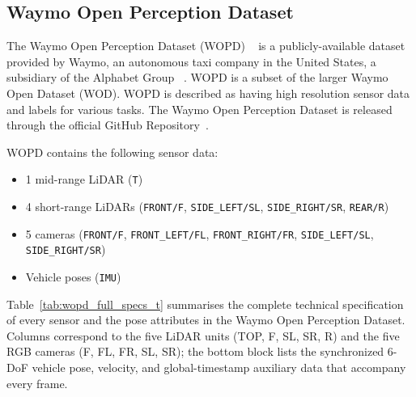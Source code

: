 \subsection{Waymo Open Perception Dataset}

The Waymo Open Perception Dataset (WOPD) ~\parencite{Sun_2020_CVPR} is a publicly-available dataset provided by Waymo, an autonomous taxi company in the United States, a subsidiary of the Alphabet Group ~\parencite{waymo2025}. WOPD is a subset of the larger Waymo Open Dataset (WOD). WOPD is described as  having high resolution sensor data and labels for various tasks. The Waymo Open Perception Dataset is released through the official GitHub Repository~\parencite{waymo2025dataset}.

WOPD contains the following sensor data:

\sloppy
\begin{itemize}
    \item 1 mid-range LiDAR (\verb|T|)
    \item 4 short-range LiDARs (\verb|FRONT/F|, \verb|SIDE_LEFT/SL|, \verb|SIDE_RIGHT/SR|, \verb|REAR/R|)
    \item 5 cameras (\verb|FRONT/F|, \verb|FRONT_LEFT/FL|, \verb|FRONT_RIGHT/FR|, \verb|SIDE_LEFT/SL|, \verb|SIDE_RIGHT/SR|)
    \item Vehicle poses (\verb|IMU|)
\end{itemize}


Table~\ref{tab:wopd_full_specs_t} summarises the complete technical specification of every sensor and the pose attributes in the Waymo Open Perception Dataset.
Columns correspond to the five LiDAR units (TOP, F, SL, SR, R) and the five RGB cameras (F, FL, FR, SL, SR); the bottom block lists the synchronized 6-DoF vehicle pose, velocity, and global-timestamp auxiliary data that accompany every frame.

